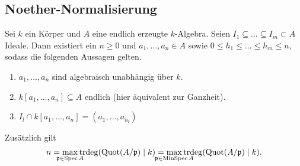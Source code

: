 \documentclass[12pt,a4paper]{scrartcl}
\theoremstyle{cplain}
\theoremstyle{cdef}
\begin{document}
\subsection{Noether-Normalisierung}
\begin{satz} \label{thm:noether-normalisierung}
	Sei $k$ ein Körper und $A$ eine endlich erzeugte $k$-Algebra. Seien $I_1\subseteq \dots \subseteq I_m\subset A$ Ideale. Dann existiert ein $n\geq 0$ und $a_1,\dots, a_n\in A$ sowie $0\leq h_1\leq\dots \leq h_m\leq n$, sodass die folgenden Aussagen gelten. 
	\begin{enumerate}
		\item $a_1,\dots, a_n$ sind algebraisch unabhängig über $k$.
		\item $k[a_1,\dots, a_n]\subseteq A$ endlich (hier äquivalent zur Ganzheit).
		\item $I_l\cap k[a_1,\dots, a_n] = (a_1,\dots, a_{h_l})$
	\end{enumerate}
	Zusätzlich gilt
	\[n = \max_{\mathclap{\fp\in\Spec A}} \trdeg(\Quot(A/\fp)\mid k) = \max_{\mathclap{\fp \in \MinSpec A}}\trdeg(\Quot(A/\fp)\mid k).\]
\end{satz}

\end{document}
